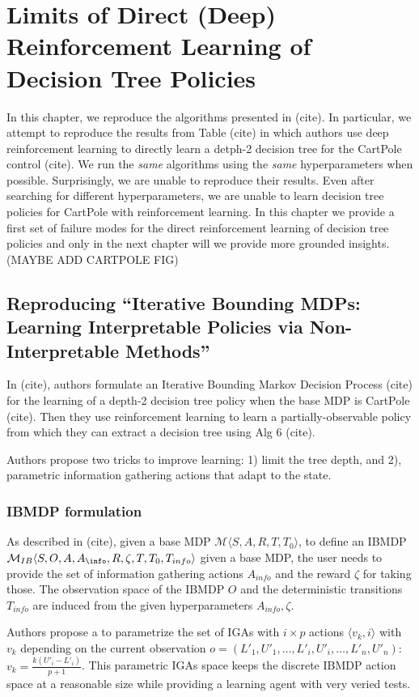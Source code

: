 \chapter{Limits of Direct (Deep) Reinforcement Learning of Decision Tree Policies}
In this chapter, we reproduce the algorithms presented in (cite). In particular, we attempt to reproduce the results from Table (cite) in which authors use deep reinforcement learning to directly learn a detph-2 decision tree for the CartPole control (cite).
We run the \textit{same} algorithms using the \textit{same} hyperparameters when possible.
Surprisingly, we are unable to reproduce their results. Even after searching for different hyperparameters, we are unable to learn decision tree policies for CartPole with reinforcement learning. 
In this chapter we provide a first set of failure modes for the direct reinforcement learning of decision tree policies and only in the next chapter will we provide more grounded insights.
(MAYBE ADD CARTPOLE FIG)
\section{Reproducing ``Iterative Bounding MDPs: Learning Interpretable Policies via Non-Interpretable Methods''}
In (cite), authors formulate an Iterative Bounding Markov Decision Process (cite) for the learning of a depth-2 decision tree policy when the base MDP is CartPole (cite).
Then they use reinforcement learning to learn a partially-observable policy from which they can extract a decision tree using Alg 6 (cite). 

Authors propose two tricks to improve learning: 1) limit the tree depth, and 2), parametric information gathering actions that adapt to the state.

\subsection{IBMDP formulation}
As described in (cite), given a base MDP $\mathcal{M}\langle S, A, R, T, T_0\rangle$, to define an IBMDP $\mathcal{M}_{IB}\langle S, O, A, A_{\info}, R, \zeta, T, T_0, T_{info}\rangle$ given a base MDP, the user needs to provide the set of information gathering actions $A_{info}$ and the reward $\zeta$ for taking those.
The observation space of the IBMDP $O$ and the deterministic transitions $T_{info}$ are induced from the given hyperparameters $A_{info}, \zeta$.

Authors propose a to parametrize the set of IGAs with $i \times p$ actions $\langle v_k, i \rangle$ with $v_k$ depending on the current observation $o=(L'_1, U'_1, \dots, L'_i, U'_i, \dots, L'_n, U'_n)$: $v_k = \frac{k(U'_i - L'_i)}{p+1}$.
This parametric IGAs space keeps the discrete IBMDP action space at a reasonable size while providing a learning agent with very veried tests.

